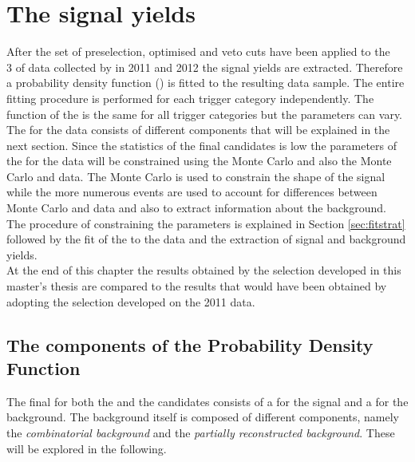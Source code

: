 \chapter{The \BdKstee signal yields}
\label{Chapter5}
After the set of preselection, optimised and veto cuts have been applied to the \\3 \invfb of data collected by \lhcb in 2011 and 2012 the signal yields are extracted. Therefore a probability density function (\PDF) is fitted to the resulting data sample. The entire fitting procedure is performed for each trigger category independently. The function of the \PDF is the same for all trigger categories but the parameters can vary.\\
The \PDF for the \BdKstee \lhcb data consists of different components that will be explained in the next section. Since the statistics of the final \BdKstee candidates is low the parameters of the \PDF for the \BdKstee data will be constrained using the \BdKstee Monte Carlo and also the \BdToJPsieeKst Monte Carlo and data. The \BdKstee Monte Carlo is used to constrain the shape of the signal while the more numerous \BdToJPsieeKst events are used to account for differences between Monte Carlo and \lhcb data and also to extract information about the background. The procedure of constraining the parameters is explained in Section \ref{sec:fitstrat} followed by the fit of the \PDF to the \BdKstee data and the extraction of signal and background yields.\\
At the end of this chapter the results obtained by the selection developed in this master's thesis are compared to the results that would have been obtained by adopting the selection developed on the 2011 \lhcb data.\\

\section{The components of the Probability Density Function}
\label{sec:pdfs}
The final \PDF for both the \BdKstee and the \BdToJPsieeKst candidates consists of a \PDF for the signal and a \PDF for the background. The background \PDF itself is composed of different components, namely the \textit{combinatorial background} and the \textit{partially reconstructed background}. These \PDF will be explored in the following.\\

